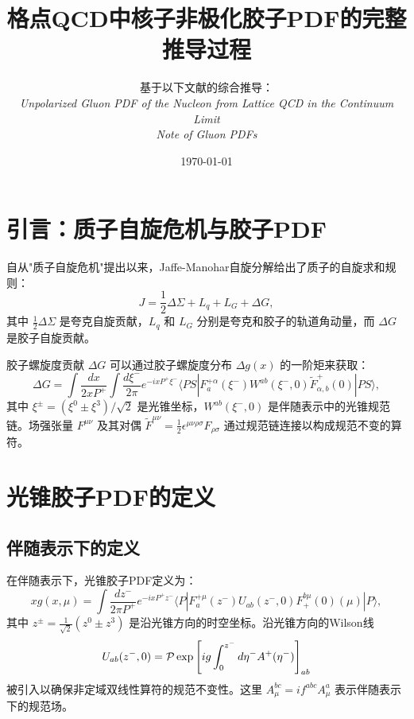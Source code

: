 \documentclass[11pt,a4paper]{article}
\title{\textbf{格点QCD中核子非极化胶子PDF的完整推导过程}}
\author{基于以下文献的综合推导：\\
\textit{Unpolarized Gluon PDF of the Nucleon from Lattice QCD in the Continuum Limit}\\
\textit{Note of Gluon PDFs}}
\date{\today}
\newcommand{\Wab}{W^{ab}}
\begin{document}
\maketitle
\tableofcontents
\newpage

\section{引言：质子自旋危机与胶子PDF}

自从"质子自旋危机"提出以来，Jaffe-Manohar自旋分解给出了质子的自旋求和规则\cite{Jaffe:1989jz}：
\begin{equation}
    J = \frac{1}{2}\Delta\Sigma + L_q + L_G + \Delta G,
\end{equation}
其中 $\frac{1}{2}\Delta\Sigma$ 是夸克自旋贡献，$L_q$ 和 $L_G$ 分别是夸克和胶子的轨道角动量，而 $\Delta G$ 是胶子自旋贡献。

胶子螺旋度贡献 $\Delta G$ 可以通过胶子螺旋度分布 $\Delta g(x)$ 的一阶矩来获取：
\begin{equation}
    \Delta G = \int \frac{dx}{2xP^+} \int \frac{d\xi^-}{2\pi} e^{-ixP^+\xi^-} \langle PS | F^{+\alpha}_a(\xi^-) \Wab(\xi^-,0) \tilde{F}^+_{\alpha,b}(0) | PS \rangle,
\end{equation}
其中 $\xi^\pm = (\xi^0 \pm \xi^3)/\sqrt{2}$ 是光锥坐标，$\Wab(\xi^-,0)$ 是伴随表示中的光锥规范链。场强张量 $F^{\mu\nu}$ 及其对偶 $\tilde{F}^{\mu\nu} = \frac{1}{2}\epsilon^{\mu\nu\rho\sigma}F_{\rho\sigma}$ 通过规范链连接以构成规范不变的算符。

\section{光锥胶子PDF的定义}

\subsection{伴随表示下的定义}

在伴随表示下，光锥胶子PDF定义为\cite{Balitsky:2019krj}：
\begin{equation}\label{eq:lightcone_pdf}
    x g(x, \mu) = \int \frac{dz^-}{2\pi P^+} e^{-ixP^+z^-} \langle P | F^{+\mu}_a(z^-) U_{ab}(z^-,0) F^{b\mu}_{+}(0)(\mu) | P \rangle,
\end{equation}
其中 $z^\pm = \frac{1}{\sqrt{2}}(z^0 \pm z^3)$ 是沿光锥方向的时空坐标。沿光锥方向的Wilson线
\begin{equation}
    U_{ab}(z^-,0) = \mathcal{P}\exp\qty[ig \int_0^{z^-} d\eta^- A^+(\eta^-)]_{ab}
\end{equation}
被引入以确保非定域双线性算符的规范不变性。这里 $A^{bc}_\mu = i f^{abc} A^a_\mu$ 表示伴随表示下的规范场。
\end{document}
